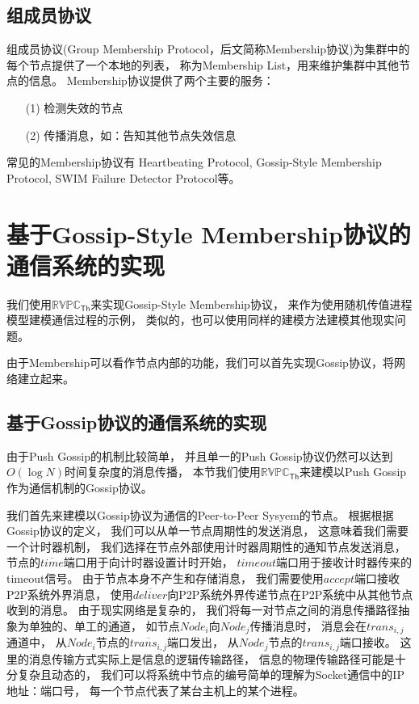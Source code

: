 \subsection{组成员协议}

组成员协议(Group Membership Protocol，后文简称Membership协议)\cite{Membership}为集群中的每个节点提供了一个本地的列表，
称为Membership List，用来维护集群中其他节点的信息。
Membership协议提供了两个主要的服务：
\begin{itemize}
   \item[(1)] 检测失效的节点
   \item[(2)] 传播消息，如：告知其他节点失效信息
\end{itemize}

常见的Membership协议有
Heartbeating Protocol\cite{Heartbeat}, 
Gossip-Style Membership Protocol\cite{Gossip_style}, 
SWIM Failure Detector Protocol\cite{SWIM}等。

\section{基于Gossip-Style Membership协议的通信系统的实现}
我们使用$\mathbb{RVPC}_{\mathsf{Th}}$来实现Gossip-Style Membership协议\cite{Gossip_style}，
来作为使用随机传值进程模型建模通信过程的示例，
类似的，也可以使用同样的建模方法建模其他现实问题。

由于Membership可以看作节点内部的功能，我们可以首先实现Gossip协议，将网络建立起来。

\subsection{基于Gossip协议的通信系统的实现}\label{ch:gossip_impl}
由于Push Gossip的机制比较简单，
并且单一的Push Gossip协议仍然可以达到$O(\log N)$时间复杂度的消息传播\cite{Gossip}，
本节我们使用$\mathbb{RVPC}_{\mathsf{Th}}$来建模以Push Gossip作为通信机制的Gossip协议。

我们首先来建模以Gossip协议为通信的Peer-to-Peer Sysyem的节点。
根据根据Gossip协议的定义，
我们可以从单一节点周期性的发送消息，
这意味着我们需要一个计时器机制，
我们选择在节点外部使用计时器周期性的通知节点发送消息，
节点的$\overline{time}$端口用于向计时器设置计时开始，
$timeout$端口用于接收计时器传来的timeout信号。
由于节点本身不产生和存储消息，
我们需要使用$accept$端口接收P2P系统外界消息，
使用$\overline{deliver}$向P2P系统外界传递节点在P2P系统中从其他节点收到的消息。
由于现实网络是复杂的，
我们将每一对节点之间的消息传播路径抽象为单独的、单工的通道，
如节点$Node_i$向$Node_j$传播消息时，
消息会在$trans_{i,j}$通道中，
从$Node_i$节点的$\overline{trans_{i,j}}$端口发出，
从$Node_j$节点的$trans_{i,j}$端口接收。
这里的消息传输方式实际上是信息的逻辑传输路径，
信息的物理传输路径可能是十分复杂且动态的，
我们可以将系统中节点的编号简单的理解为Socket通信中的IP地址：端口号，
每一个节点代表了某台主机上的某个进程。

